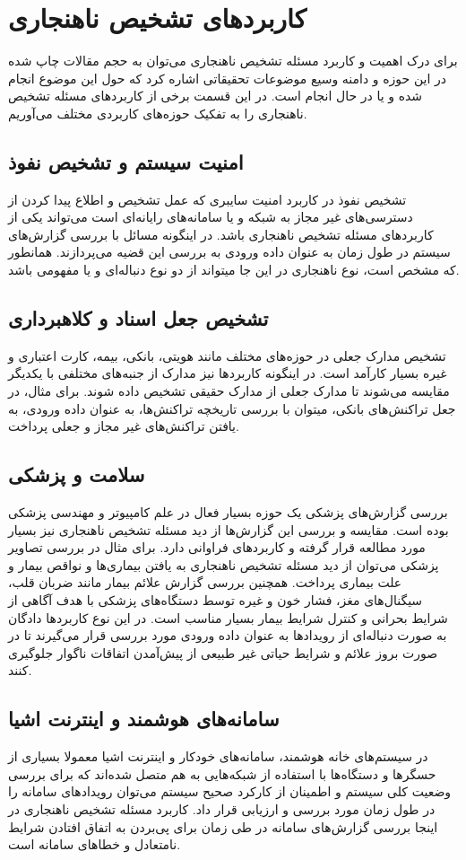 \documentclass[12pt,a4paper]{report}
\theoremstyle{definition}
\theoremstyle{definition}
\begin{document}
\section {کاربرد‌های تشخیص ناهنجاری}
برای درک اهمیت و کاربرد مسئله تشخیص ناهنجاری می‌توان به حجم مقالات چاپ شده در این حوزه و دامنه وسیع موضوعات تحقیقاتی اشاره کرد که حول این موضوع انجام شده و یا در حال انجام است. در این قسمت برخی از کاربرد‌های مسئله تشخیص ناهنجاری را به تفکیک حوزه‌های کاربردی مختلف می‌آوریم.

\subsection{امنیت سیستم و تشخیص نفوذ}
تشخیص نفوذ در کاربرد امنیت سایبری که عمل تشخیص و اطلاع پیدا کردن از دسترسی‌های غیر مجاز به شبکه و یا سامانه‌های رایانه‌ای است می‌تواند یکی از کاربرد‌های مسئله تشخیص ناهنجاری باشد. در اینگونه مسائل با بررسی گزارش‌های سیستم در طول زمان به عنوان داده ورودی به بررسی این قضیه می‌پردازند. همانطور که مشخص است، نوع  ناهنجاری در این جا میتواند از دو نوع دنباله‌ای و یا مفهومی باشد.

\subsection{تشخیص جعل اسناد و کلاهبرداری}
تشخیص مدارک جعلی در حوزه‌های مختلف مانند هویتی، بانکی، بیمه، کارت اعتباری و غیره بسیار کارآمد است. در اینگونه کاربردها نیز مدارک از جنبه‌های مختلفی با یکدیگر مقایسه می‌شوند تا مدارک جعلی از مدارک حقیقی تشخیص داده شوند. برای مثال، در جعل تراکنش‌های بانکی، میتوان با بررسی تاریخچه تراکنش‌ها، به عنوان داده ورودی، به یافتن تراکنش‌های غیر مجاز و جعلی پرداخت.

\subsection{سلامت و پزشکی}
بررسی گزارش‌های پزشکی یک حوزه بسیار فعال در علم کامپیوتر و مهندسی پزشکی بوده است. مقایسه و بررسی این گزارش‌ها از دید مسئله تشخیص ناهنجاری نیز بسیار مورد مطالعه قرار گرفته و کاربرد‌های فراوانی دارد. برای مثال در بررسی تصاویر پزشکی می‌توان از دید مسئله تشخیص ناهنجاری به یافتن بیماری‌ها و نواقص بیمار و علت بیماری پرداخت. همچنین بررسی گزارش علائم بیمار مانند ضربان قلب، سیگنال‌های مغز، فشار خون و غیره توسط دستگاه‌های پزشکی با هدف آگاهی از شرایط بحرانی و کنترل شرایط بیمار بسیار مناسب است. در این نوع کاربرد‌ها دادگان به صورت دنباله‌ای از رویداد‌ها به عنوان داده ورودی مورد بررسی قرار می‌گیرند تا در صورت بروز علائم و شرایط حیاتی غیر طبیعی از پیش‌آمدن اتفاقات ناگوار جلوگیری کنند.
\subsection{سامانه‌های هوشمند و اینترنت اشیا}
در سیستم‌های خانه هوشمند، سامانه‌های خودکار و اینترنت اشیا معمولا بسیاری از حسگر‌ها و دستگاه‌ها با استفاده از شبکه‌هایی به هم متصل شده‌اند که برای بررسی وضعیت کلی سیستم و اطمینان از کارکرد صحیح سیستم می‌توان رویداد‌های سامانه را در طول زمان مورد بررسی و ارزیابی قرار داد. کاربرد مسئله تشخیص ناهنجاری در اینجا بررسی گزارش‌های سامانه در طی زمان برای پی‌بردن به اتفاق افتادن شرایط نامتعادل و خطا‌های سامانه است.
\end{document}
